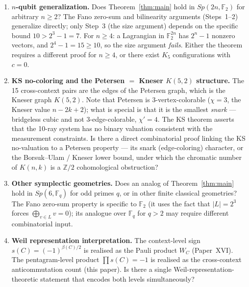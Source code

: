 \documentclass[11pt,a4paper]{article}
\theoremstyle{remark}
\begin{document}
\begin{enumerate}

\item \textbf{$n$-qubit generalization.}
      Does Theorem~\ref{thm:main} hold in $Sp(2n, \mathbb{F}_2)$
      for arbitrary $n \geq 2$?
      The Fano zero-sum and bilinearity arguments (Steps~1--2) generalize
      directly; only Step~3 (the size argument) depends on the specific
      bound $10 > 2^3 - 1 = 7$.
      For $n \geq 4$: a Lagrangian in $\mathbb{F}_2^{2n}$ has $2^n - 1$
      nonzero vectors, and $2^4 - 1 = 15 \geq 10$, so the size argument
      \emph{fails}.
      Either the theorem requires a different proof for $n \geq 4$,
      or there exist $K_5$ configurations with $c = 0$.

\item \textbf{KS no-coloring and the Petersen $=$ Kneser $K(5,2)$ structure.}
      The 15 cross-context pairs are the edges of the Petersen graph, which is the
      Kneser graph $K(5,2)$.  Note that Petersen is $3$-vertex-colorable
      ($\chi=3$, the Kneser value $n-2k+2$); what is special is that it is the
      smallest \emph{snark} --- bridgeless cubic and not $3$-edge-colorable,
      $\chi'=4$.  The KS theorem asserts that the 10-ray system has no binary
      valuation consistent with the measurement constraints.  Is there a direct
      combinatorial proof linking the KS no-valuation to a Petersen property ---
      its snark (edge-coloring) character, or the Borsuk--Ulam / Kneser lower
      bound, under which the chromatic number of $K(n,k)$ is a $\mathbb{Z}/2$
      cohomological obstruction?

\item \textbf{Other symplectic geometries.}
      Does an analog of Theorem~\ref{thm:main} hold in $Sp(6, \mathbb{F}_q)$
      for odd primes $q$, or in other finite classical geometries?
      The Fano zero-sum property is specific to $\mathbb{F}_2$
      (it uses the fact that $|L| = 2^3$ forces $\bigoplus_{v \in L} v = 0$);
      its analogue over $\mathbb{F}_q$ for $q > 2$ may require different
      combinatorial input.

\item \textbf{Weil representation interpretation.}
      The context-level sign $s(C) = (-1)^{\beta(C)/2}$ is realised
      as the Pauli product $W_C$ (Paper~XVI).
      The pentagram-level product $\prod s(C) = -1$
      is realised as the cross-context anticommutation count (this paper).
      Is there a single Weil-representation-theoretic statement
      that encodes both levels simultaneously?

\end{enumerate}
\end{document}
